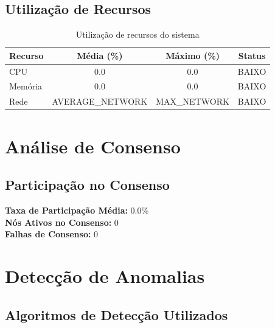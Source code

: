 \documentclass[12pt,a4paper]{article}
\begin{document}
\subsection{Utilização de Recursos}

\begin{table}[h!]
\centering
\begin{tabular}{@{}lccc@{}}
\toprule
\textbf{Recurso} & \textbf{Média (\%)} & \textbf{Máximo (\%)} & \textbf{Status} \\
\midrule
CPU & 0.0 & 0.0 & \textcolor{success}{BAIXO} \\
Memória & 0.0 & 0.0 & \textcolor{success}{BAIXO} \\
Rede & AVERAGE_NETWORK & MAX_NETWORK & \textcolor{success}{BAIXO} \\
\bottomrule
\end{tabular}
\caption{Utilização de recursos do sistema}
\end{table}

\section{Análise de Consenso}

\subsection{Participação no Consenso}

\textbf{Taxa de Participação Média:} 0.0\%\\
\textbf{Nós Ativos no Consenso:} 0\\
\textbf{Falhas de Consenso:} 0

\begin{center}
\end{center}

\section{Detecção de Anomalias}

\subsection{Algoritmos de Detecção Utilizados}
\end{document}
